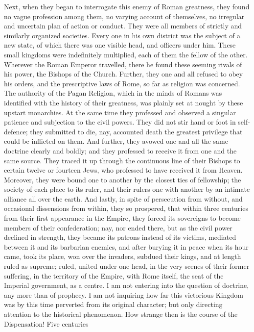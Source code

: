Next, when they began to interrogate this enemy of Roman greatness,
they found no vague profession among them, no varying account of
themselves, no irregular and uncertain plan of action or conduct. They
were all members of strictly and similarly organized societies. Every
one in his own district was the subject of a new state, of which there
was one visible head, and officers under him. These small kingdoms were
indefinitely multiplied, each of them the fellow of the other. Wherever
the Roman Emperor travelled, there he found these seeming rivals of his
power, the Bishops of the Church. Further, they one and all refused to
obey his orders, and the prescriptive laws of Rome, so far as religion
was concerned. The authority of the Pagan Religion, which in the minds
of Romans was identified with the history of their greatness, was
plainly set at nought by these upstart monarchies. At the same time they
professed and observed a singular patience and subjection to the civil
powers. They did not stir hand or foot in self-defence; they submitted
to die, nay, accounted death the greatest privilege that could be
inflicted on them. And further, they avowed one and all the same
doctrine clearly and boldly; and they professed to receive it from one
and the same source. They traced it up through the continuous line of
their Bishops to certain twelve or fourteen Jews, who professed to have
received it from Heaven. Moreover, they were bound one to another by the
closest ties of fellowship; the society of each place to its ruler, and
their rulers one with another by an intimate alliance all over the
earth. And lastly, in spite of persecution from without, and occasional
dissensions from within, they so prospered, that within three centuries
from their first appearance in the Empire, they forced its sovereigns to
become members of their confederation; nay, nor ended there, but as the
civil power declined in strength, they became its patrons instead of its
victims, mediated between it and its barbarian enemies, and after
burying it in peace when its hour came, took its place, won over the
invaders, subdued their kings, and at length ruled as supreme; ruled,
united under one head, in the very scenes of their former suffering, in
the territory of the Empire, with Rome itself, the seat of the Imperial
government, as a centre. I am not entering into the question of
doctrine, any more than of prophecy. I am not inquiring how far this
victorious Kingdom was by this time perverted from its original
character; but only directing attention to the historical phenomenon.
How strange then is the course of the Dispensation! Five centuries
